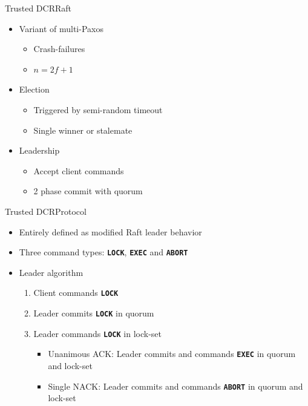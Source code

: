 \documentclass{beamer}
\begin{document}
\begin{frame}{Trusted DCR}{Raft}%
  \begin{itemize}
    \item Variant of multi-Paxos
    \begin{itemize}
      \item Crash-failures
      \item $n = 2f+1$
    \end{itemize}

    \vfill

    \item Election
    \begin{itemize}
      \item Triggered by semi-random timeout
      \item Single winner or stalemate
    \end{itemize}

    \vfill

    \item Leadership
    \begin{itemize}
      \item Accept client commands
      \item 2 phase commit with quorum
    \end{itemize}
  \end{itemize}

\end{frame}

\begin{frame}{Trusted DCR}{Protocol}%
  \begin{itemize}
    \item Entirely defined as modified Raft leader behavior
    \item Three command types: \textbf{\texttt{LOCK}}, \textbf{\texttt{EXEC}} and \textbf{\texttt{ABORT}}

    \vfill

    \item Leader algorithm
    \begin{enumerate}
      \item Client commands \textbf{\texttt{LOCK}}
      \item Leader commits \textbf{\texttt{LOCK}} in quorum
      \item Leader commands \textbf{\texttt{LOCK}} in lock-set
      \begin{itemize}
        \item Unanimous ACK: Leader commits and commands \textbf{\texttt{EXEC}} in quorum and lock-set
        \item Single NACK: Leader commits and commands \textbf{\texttt{ABORT}} in quorum and lock-set
      \end{itemize}
    \end{enumerate}
  \end{itemize}
\end{frame}
\end{document}
